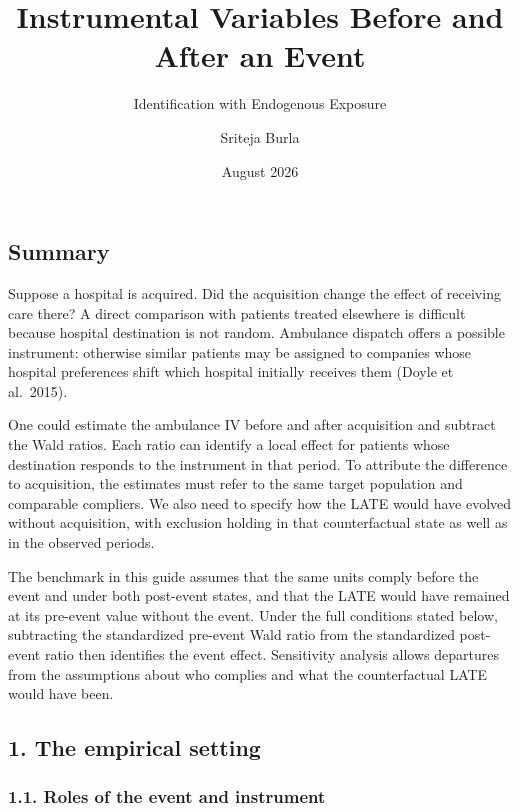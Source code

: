 \documentclass[
  11pt,
]{article}
\title{Instrumental Variables Before and After an Event}
\subtitle{Identification with Endogenous Exposure}
\author{Sriteja Burla}
\date{August 2026}
\begin{document}
\maketitle

{
\setcounter{tocdepth}{2}
\tableofcontents
}
\hypertarget{summary}{%
\subsection{Summary}\label{summary}}

Suppose a hospital is acquired. Did the acquisition change the effect of
receiving care there? A direct comparison with patients treated
elsewhere is difficult because hospital destination is not random.
Ambulance dispatch offers a possible instrument: otherwise similar
patients may be assigned to companies whose hospital preferences shift
which hospital initially receives them (Doyle et al.~2015).

One could estimate the ambulance IV before and after acquisition and
subtract the Wald ratios. Each ratio can identify a local effect for
patients whose destination responds to the instrument in that period. To
attribute the difference to acquisition, the estimates must refer to the
same target population and comparable compliers. We also need to specify
how the LATE would have evolved without acquisition, with exclusion
holding in that counterfactual state as well as in the observed periods.

The benchmark in this guide assumes that the same units comply before
the event and under both post-event states, and that the LATE would have
remained at its pre-event value without the event. Under the full
conditions stated below, subtracting the standardized pre-event Wald
ratio from the standardized post-event ratio then identifies the event
effect. Sensitivity analysis allows departures from the assumptions
about who complies and what the counterfactual LATE would have been.

\hypertarget{the-empirical-setting}{%
\subsection{1. The empirical setting}\label{the-empirical-setting}}

\hypertarget{roles-of-the-event-and-instrument}{%
\subsubsection{1.1. Roles of the event and
instrument}\label{roles-of-the-event-and-instrument}}
\end{document}
